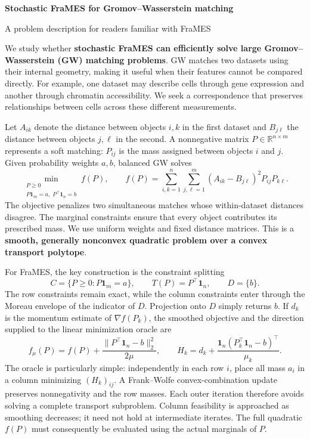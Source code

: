 \documentclass[11pt,a4paper]{article}
\newcommand{\one}{\mathbf{1}}
\begin{document}
{\fontsize{15}{18}\selectfont\bfseries Stochastic FraMES for Gromov--Wasserstein matching\par}
\vspace{2pt}
{\small A problem description for readers familiar with FraMES\par}
\vspace{5pt}

We study whether \textbf{stochastic FraMES can efficiently solve large Gromov--Wasserstein (GW) matching problems}. GW matches two datasets using their internal geometry, making it useful when their features cannot be compared directly. For example, one dataset may describe cells through gene expression and another through chromatin accessibility. We seek a correspondence that preserves relationships between cells across these different measurements.

Let $A_{ik}$ denote the distance between objects $i,k$ in the first dataset and $B_{j\ell}$ the distance between objects $j,\ell$ in the second. A nonnegative matrix $P\in\mathbb{R}^{n\times m}$ represents a soft matching: $P_{ij}$ is the mass assigned between objects $i$ and $j$. Given probability weights $a,b$, balanced GW solves
\[
  \min_{\substack{P\geq 0\\P\one_m=a,\;P^\top\one_n=b}} f(P),
  \qquad
  f(P)=\sum_{i,k=1}^{n}\sum_{j,\ell=1}^{m}
           (A_{ik}-B_{j\ell})^2P_{ij}P_{k\ell}.
\]
The objective penalizes two simultaneous matches whose within-dataset distances disagree. The marginal constraints ensure that every object contributes its prescribed mass. We use uniform weights and fixed distance matrices. This is a \textbf{smooth, generally nonconvex quadratic problem over a convex transport polytope}.

For FraMES, the key construction is the constraint splitting
\[
 C=\{P\geq0:P\one_m=a\},\qquad T(P)=P^\top\one_n,\qquad D=\{b\}.
\]
The row constraints remain exact, while the column constraints enter through the Moreau envelope of the indicator of $D$. Projection onto $D$ simply returns $b$. If $d_k$ is the momentum estimate of $\nabla f(P_k)$, the smoothed objective and the direction supplied to the linear minimization oracle are
\[
 f_\mu(P)=f(P)+\frac{\|P^\top\one_n-b\|_2^2}{2\mu},
 \qquad
 H_k=d_k+\frac{\one_n(P_k^\top\one_n-b)^\top}{\mu_k}.
\]
The oracle is particularly simple: independently in each row $i$, place all mass $a_i$ in a column minimizing $(H_k)_{ij}$. A Frank--Wolfe convex-combination update preserves nonnegativity and the row masses. Each outer iteration therefore avoids solving a complete transport subproblem. Column feasibility is approached as smoothing decreases; it need not hold at intermediate iterates. The full quadratic $f(P)$ must consequently be evaluated using the actual marginals of $P$.
\end{document}
